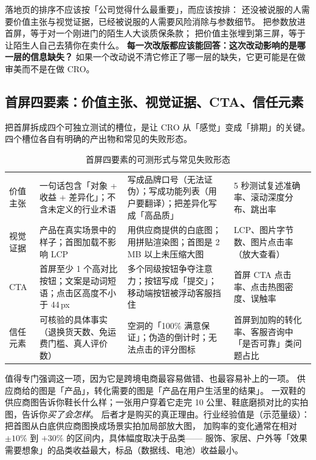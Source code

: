 \begin{keypoint}
落地页的排序不应该按「公司觉得什么最重要」，而应该按排：
还没被说服的人需要价值主张与视觉证据，已经被说服的人需要风险消除与参数细节。
把参数放进首屏，等于对一个刚进门的陌生人大谈质保条款；
把价值主张埋到第三屏，等于让陌生人自己去猜你在卖什么。
\textbf{每一次改版都应该能回答：这次改动影响的是哪一层的信息缺失？}
如果一个改动说不清它修正了哪一层的缺失，它更可能是在做审美而不是在做 CRO。
\end{keypoint}

\subsection{首屏四要素：价值主张、视觉证据、CTA、信任元素}

把首屏拆成四个可独立测试的槽位，是让 CRO 从「感觉」变成「排期」的关键。
四个槽位各自有明确的产出物和常见的失败形态。

\begin{table}[htbp]
\centering
\caption{首屏四要素的可测形式与常见失败形态}
\label{tab:hero-four}
\small
\begin{tabularx}{\textwidth}{L{1.9cm} L{3.4cm} L{3.6cm} Y}
\toprule
{} &  &  &  \\
\midrule
价值主张 & 一句话包含「对象 + 收益 + 差异化」；不含未定义的行业术语 & 写成品牌口号（无法证伪）；写成功能列表（用户要翻译）；把差异化写成「高品质」 & 5 秒测试复述准确率、滚动深度分布、跳出率 \\
视觉证据 & 产品在真实场景中的样子；首图加载不影响 LCP & 用供应商提供的白底图；用拼贴渲染图；首图是 2\,MB 以上未压缩大图 & LCP、图片字节数、图片点击率（放大查看） \\
CTA & 首屏至少 1 个高对比按钮；文案是动词短语；点击区高度不小于 44\,px & 多个同级按钮争夺注意力；按钮写成「提交」；移动端按钮被浮动客服挡住 & 首屏 CTA 点击率、点击热图密度、误触率 \\
信任元素 & 可核验的具体事实（退换货天数、免运费门槛、真人评价数） & 空洞的「100\% 满意保证」；伪造的倒计时；无法点击的评分图标 & 首屏到加购的转化率、客服咨询中「是否可靠」类问题占比 \\
\bottomrule
\end{tabularx}
\end{table}

值得专门强调这一项，因为它是跨境电商最容易做错、也最容易补上的一项。
供应商给的图是「产品」，转化需要的图是「产品在用户生活里的结果」。
一双鞋的供应商图告诉你鞋长什么样；一张用户穿着它走完 10 公里、鞋底磨损对比的实拍图，告诉你\emph{买了会怎样}。
后者才是购买的真正理由。行业经验值是（示范量级）：把首图从白底供应商图换成场景实拍加局部放大图，
加购率的变化通常在相对 $\pm 10\%$ 到 $+30\%$ 的区间内，具体幅度取决于品类——
服饰、家居、户外等「效果需要想象」的品类收益最大，标品（数据线、电池）收益最小。

